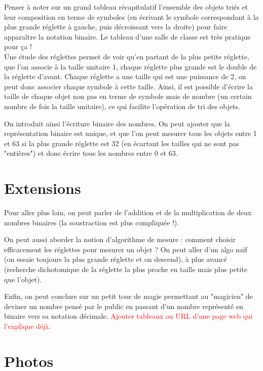 \documentclass[a4paper,12pt]{scrartcl}
\begin{document}
Penser à noter sur un grand tableau récapitulatif l'ensemble des objets triés et leur composition en terme de symboles (en écrivant le symbole correspondant à la plus grande réglette à gauche, puis décroissant vers la droite) pour faire apparaître la notation binaire. Le tableau d'une salle de classe est très pratique pour ça !\\


Une étude des réglettes permet de voir qu'en partant de la plus petite réglette, que l'on associe à la taille unitaire 1, chaque réglette plus grande est le double de la réglette d'avant. 
%
Chaque réglette a une taille qui est une puissance de 2, on peut donc associer chaque symbole à cette taille. Ainsi, il est possible d'écrire la taille de chaque objet non pas en terme de symbole mais de nombre (un certain nombre de fois la taille unitaire), ce qui facilite l'opération de tri des objets.

On introduit ainsi l'écriture binaire des nombres.
On peut ajouter que la représentation binaire est unique, et que l'on peut mesurer tous les objets entre 1 et 63 si la plus grande réglette est 32 (en écartant les tailles qui ne sont pas "entières") et donc écrire tous les nombres entre 0 et 63.


\section{Extensions}

Pour aller plus loin, on peut parler de l'addition et de la multiplication de deux nombres binaires (la soustraction est plus compliquée !).

On peut aussi aborder la notion d'algorithme de mesure : comment choisir efficacement les réglettes pour mesurer un objet ? On peut aller d'un algo naïf (on essaie toujours la plus grande réglette et on descend), à plus avancé (recherche dichotomique de la réglette la plus proche en taille mais plus petite que l'objet).

Enfin, on peut conclure sur un petit tour de magie permettant au "magicien" de deviner un nombre pensé par le public en passant d'un nombre représenté en binaire vers sa notation décimale.
\textcolor{red}{Ajouter tableaux ou URL d'une page web qui l'explique déjà.}



\newpage
\section{Photos}
\end{document}
